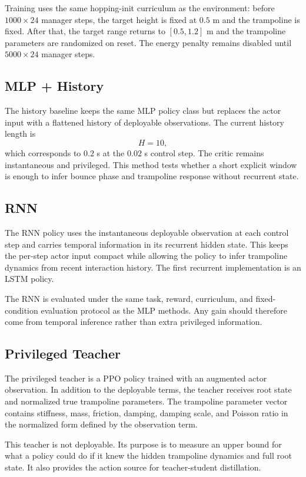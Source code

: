\documentclass[11pt, a4paper]{article}
\begin{document}
Training uses the same hopping-init curriculum as the environment: before
$1000\times24$ manager steps, the target height is fixed at $0.5$ m and the
trampoline is fixed. After that, the target range returns to $[0.5,1.2]$ m and
the trampoline parameters are randomized on reset. The energy penalty remains
disabled until $5000\times24$ manager steps.

\subsection{MLP + History}

The history baseline keeps the same MLP policy class but replaces the actor
input with a flattened history of deployable observations. The current history
length is
\[
    H=10,
\]
which corresponds to $0.2$ s at the $0.02$ s control step. The critic remains
instantaneous and privileged. This method tests whether a short explicit window
is enough to infer bounce phase and trampoline response without recurrent
state.

\subsection{RNN}

The RNN policy uses the instantaneous deployable observation at each control
step and carries temporal information in its recurrent hidden state. This keeps
the per-step actor input compact while allowing the policy to infer trampoline
dynamics from recent interaction history. The first recurrent implementation is
an LSTM policy.

The RNN is evaluated under the same task, reward, curriculum, and fixed-condition
evaluation protocol as the MLP methods. Any gain should therefore come from
temporal inference rather than extra privileged information.

\subsection{Privileged Teacher}

The privileged teacher is a PPO policy trained with an augmented actor
observation. In addition to the deployable terms, the teacher receives root
state and normalized true trampoline parameters. The trampoline parameter vector
contains stiffness, mass, friction, damping, damping scale, and Poisson ratio in
the normalized form defined by the observation term.

This teacher is not deployable. Its purpose is to measure an upper bound for
what a policy could do if it knew the hidden trampoline dynamics and full root
state. It also provides the action source for teacher-student distillation.
\end{document}
